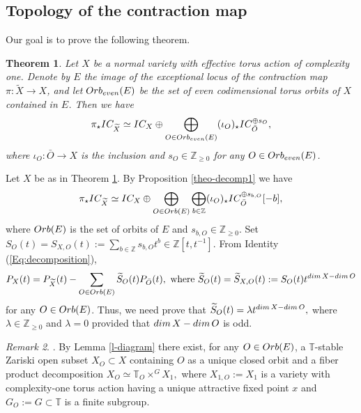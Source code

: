 \documentclass[11pt, reqno]{amsart}
\theoremstyle{plain}
\newtheorem{theorem}{Theorem}[section]
\theoremstyle{definition}
\theoremstyle{remark}
\newtheorem{remark}[theorem]{Remark}
\begin{document}
\subsection{Topology of the contraction map}\label{sec-top-contractm}
Our goal is to prove the following theorem.
\begin{theorem}\label{theo-even}
Let $X$ be a normal variety with effective torus action of complexity one. Denote by $E$ the image of the exceptional
locus of the contraction map $\pi: \widetilde{X}\rightarrow X$, and let ${\rm Orb}_{\rm even}(E)$ be the set of even codimensional torus orbits  of $X$ contained in $E$. Then we have 
$$\pi_{\star} IC_{\widetilde{X}} \simeq IC_{X}\oplus \bigoplus_{O \in {\rm Orb}_{\rm even}(E)} (\iota_{O})_{\star} IC_{\bar{O}}^{\oplus s_{O}},$$
where $\iota_{O} : \bar{O}\rightarrow X$ is the inclusion and $s_{O}\in \mathbb{Z}_{\geq 0}$ for any $O\in {\rm Orb}_{\rm even}(E)$.
\end{theorem}
Let $X$ be as in Theorem \ref{theo-even}. By Proposition \ref{theo-decomp1} we have
\begin{equation}\label{Eq:decomposition}
\pi_{\star}IC_{\widetilde{X}}\simeq IC_{X}\oplus \bigoplus_{O\in {\rm Orb}(E)}\bigoplus_{b\in\mathbb{Z}}(\iota_{O})_{\star}IC_{\bar{O}}^{\oplus s_{b, O}}[-b],
\end{equation}
where ${\rm Orb}(E)$ is the set of orbits of $E$ and $s_{b, O}\in\mathbb{Z}_{\geq 0}$. Set 
$S_{O}(t) =  S_{X, O}(t):= \sum_{b\in\mathbb{Z}}s_{b, O}t^{b}\in\mathbb{Z}[t, t^{-1}].$
From Identity (\ref{Eq:decomposition}),
$$P_{X}(t) =  P_{\widetilde{X}}(t) -\sum_{O\in{\rm Orb}(E)}\widetilde{S}_{O}(t)P_{\bar{O}}(t), \text{ where }\widetilde{S}_{O}(t) =  \widetilde{S}_{X, O}(t) := S_{O}(t)t^{{\rm dim}\, X -{\rm dim}\, O}$$ for any $O\in {\rm Orb}(E)$.
Thus, we need  prove that $\widetilde{S}_{O}(t) =  \lambda t^{{\rm dim}\, X - {\rm dim}\, O},$ where $\lambda\in\mathbb{Z}_{\geq 0}$ and $\lambda =  0$ provided that ${\rm dim}\, X - {\rm dim}\, O$ is odd. 

\begin{remark}\cite[Sections 4.1, 4.2]{AL21}. \label{remarq-XO}
By Lemma \ref{l-diagram} there exist,  for any $O\in {\rm Orb}(E)$, a $\mathbb{T}$-stable Zariski open subset $X_{O}\subset X$ containing $O$ as a unique closed orbit and a fiber product decomposition 
$X_{O}\simeq \mathbb{T}_{O}\times^{G}X_{1},$ where  $X_{1,O} :=  X_{1}$ is a variety with complexity-one torus action having a unique attractive fixed point $x$ and $G_{O} :=  G\subset \mathbb{T}$ is a finite subgroup. 
\end{remark}
\end{document}

